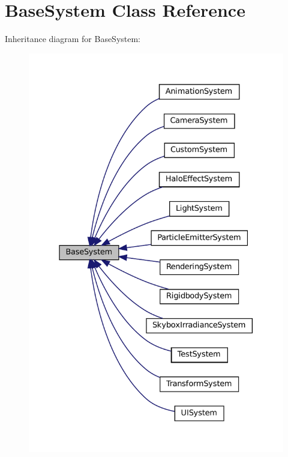 \hypertarget{classBaseSystem}{}\section{Base\+System Class Reference}
\label{classBaseSystem}


Inheritance diagram for Base\+System\+:\nopagebreak
\begin{figure}[H]
\begin{center}
\leavevmode
\includegraphics[width=331pt]{classBaseSystem__inherit__graph}
\end{center}
\end{figure}
